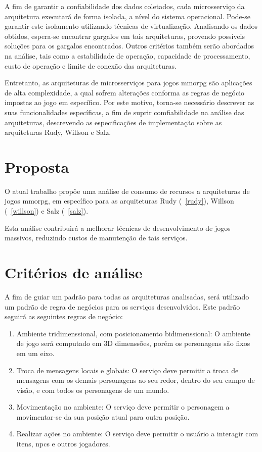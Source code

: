 A fim de garantir a confiabilidade dos dados coletados, cada microsserviço da arquitetura executará de forma isolada, a nível do sistema operacional.
%
Pode-se garantir este isolamento utilizando técnicas de virtualização.
%
Analisando os dados obtidos, espera-se encontrar gargalos em tais arquiteturas, provendo possíveis soluções para os gargalos encontrados.
%
Outros critérios também serão abordados na análise, tais como a estabilidade de operação, capacidade de processamento, custo de operação e limite de conexão das arquiteturas.
%

Entretanto, as arquiteturas de microsserviços para jogos \ac{mmorpg} são aplicações de alta complexidade, a qual sofrem alterações conforma as regras de negócio impostas ao jogo em específico.
%
Por este motivo, torna-se necessário descrever as suas funcionalidades específicas, a fim de suprir comfiabilidade na análise das arquiteturas, descrevendo as especificações de implementação sobre as arquiteturas Rudy, Willson e Salz.

\section{Proposta}

O atual trabalho propôe uma análise de consumo de recursos a arquiteturas de jogos \ac{mmorpg}, em específico para as arquiteturas Rudy (~\ref{rudy}), Willson (~\ref{willson}) e Salz (~\ref{salz}).

Esta análise contribuirá a melhorar técnicas de desenvolvimento de jogos massivos, reduzindo custos de manutenção de tais serviços.


\section{Critérios de análise}

A fim de guiar um padrão para todas as arquiteturas analisadas, será utilizado um padrão de regra de negócios para os serviços desenvolvidos.
%
Este padrão seguirá as seguintes regras de negócio:

\begin{enumerate}
  \item Ambiente tridimenssional, com posicionamento bidimenssional: O ambiente de jogo será computado em 3D dimenssões, porém os personagens são fixos em um eixo.
  \item Troca de mensagens locais e globais: O serviço deve permitir a troca de mensagens com os demais personagens ao seu redor, dentro do seu campo de visão, e com todos os personagens de um mundo.
  \item Movimentação no ambiente: O serviço deve permitir o personagem a movimentar-se da sua posição atual para outra posição.
  \item Realizar ações no ambiente: O serviço deve permitir o usuário a interagir com itens, \ac{npcs} e outros jogadores.
\end{enumerate}

